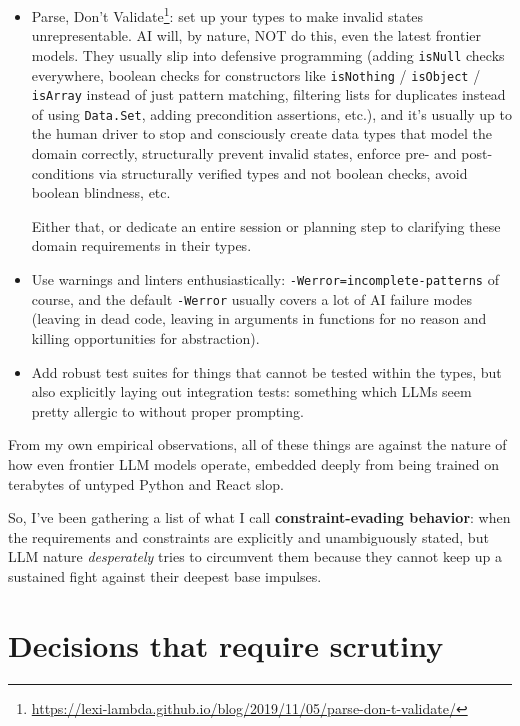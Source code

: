 \documentclass[]{article}
\renewcommand{\href}[2]{#2\footnote{\url{#1}}}
\begin{document}
\begin{itemize}
\item
  \href{https://lexi-lambda.github.io/blog/2019/11/05/parse-don-t-validate/}{Parse,
  Don't Validate}: set up your types to make invalid states unrepresentable. AI
  will, by nature, NOT do this, even the latest frontier models. They usually
  slip into defensive programming (adding \texttt{isNull} checks everywhere,
  boolean checks for constructors like \texttt{isNothing} / \texttt{isObject} /
  \texttt{isArray} instead of just pattern matching, filtering lists for
  duplicates instead of using \texttt{Data.Set}, adding precondition assertions,
  etc.), and it's usually up to the human driver to stop and consciously create
  data types that model the domain correctly, structurally prevent invalid
  states, enforce pre- and post-conditions via structurally verified types and
  not boolean checks, avoid boolean blindness, etc.

  Either that, or dedicate an entire session or planning step to clarifying
  these domain requirements in their types.
\item
  Use warnings and linters enthusiastically:
  \texttt{-Werror=incomplete-patterns} of course, and the default
  \texttt{-Werror} usually covers a lot of AI failure modes (leaving in dead
  code, leaving in arguments in functions for no reason and killing
  opportunities for abstraction).
\item
  Add robust test suites for things that cannot be tested within the types, but
  also explicitly laying out integration tests: something which LLMs seem pretty
  allergic to without proper prompting.
\end{itemize}

From my own empirical observations, all of these things are against the nature
of how even frontier LLM models operate, embedded deeply from being trained on
terabytes of untyped Python and React slop.

So, I've been gathering a list of what I call \textbf{constraint-evading
behavior}: when the requirements and constraints are explicitly and
unambiguously stated, but LLM nature \emph{desperately} tries to circumvent them
because they cannot keep up a sustained fight against their deepest base
impulses.

\section{Decisions that require scrutiny}\label{decisions-that-require-scrutiny}
\end{document}
